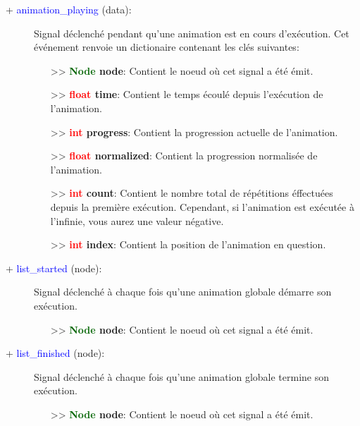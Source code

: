 \documentclass[a4paper, 11pt]{article}
\begin{document}
	\begin{description}
		\item [+ \textcolor{blue}{animation\_playing} (data):] Signal déclenché pendant qu'une animation est 
		en cours d'exécution. Cet événement renvoie un dictionaire contenant les clés suivantes:
		\begin{itemize}
			\item [>> \textbf{\textcolor{darkgreen}{Node} node}:] Contient le noeud où cet signal a été 
			émit.
			\item [>> \textbf{\textcolor{red}{float} time}:] Contient le temps écoulé depuis l'exécution de
			l'animation.
			\item [>> \textbf{\textcolor{red}{int} progress}:] Contient la progression actuelle de 
			l'animation.
			\item [>> \textbf{\textcolor{red}{float} normalized}:] Contient la progression normalisée de 
			l'animation.
			\item [>> \textbf{\textcolor{red}{int} count}:] Contient le nombre total de répétitions 
			éffectuées depuis la première exécution. Cependant, si l'animation est exécutée à l'infinie, 
			vous aurez une valeur négative.
			\item [>> \textbf{\textcolor{red}{int} index}:] Contient la position de l'animation en question.
			\\
		\end{itemize}
	\end{description}
	\begin{description}
		\item [+ \textcolor{blue}{list\_started} (node):] Signal déclenché à chaque fois qu'une animation 
		globale démarre son \\exécution.
		\begin{itemize}
			\item [>> \textbf{\textcolor{darkgreen}{Node} node}:] Contient le noeud où cet signal a été 
			émit.\\
		\end{itemize}
	\end{description}
	\begin{description}
		\item [+ \textcolor{blue}{list\_finished} (node):] Signal déclenché à chaque fois qu'une animation 
		globale termine son \\exécution.
		\begin{itemize}
			\item [>> \textbf{\textcolor{darkgreen}{Node} node}:] Contient le noeud où cet signal a été 
			émit.\\
		\end{itemize}
	\end{description}
\end{document}
